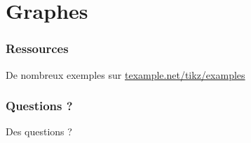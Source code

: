 \documentclass{clic_latex_beamer}
\begin{document}

\section{Graphes}
\begin{frame}[fragile]
\frametitle{}

\end{frame}
  
 
 

\begin{frame}
\frametitle{Ressources}
De nombreux exemples sur \href{http://www.texample.net/tikz/examples}{texample.net/tikz/examples}
\end{frame}
 
\begin{frame}
\frametitle{Questions ?}
\begin{center}
\Huge Des questions ?
\end{center}
\end{frame}
\end{document}
